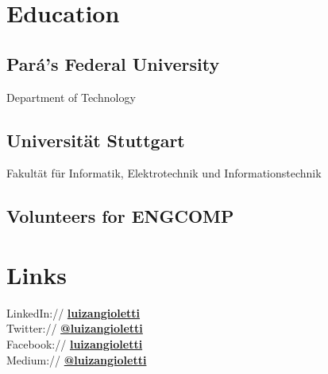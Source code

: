 \documentclass[a4paper]{deedy-resume} %
\begin{document}
\begin{minipage}[t]{0.33\textwidth} %


\section{Education} 

\subsection{Pará's Federal University}

Department of Technology \\

\sectionspace %
\subsection{Universität Stuttgart}
Fakultät für Informatik, Elektrotechnik und Informationstechnik \\
\sectionspace %


\subsection{Volunteers for ENGCOMP}


\sectionspace %


\section{Links} 

LinkedIn:// \href{https://www.linkedin.com/in/luizangioletti/?locale=en_US}{\bf luizangioletti} \\
Twitter:// \href{https://twitter.com/luizangioletti}{\bf @luizangioletti} \\
Facebook:// \href{https://facebook.com/luizangioletti}{\bf luizangioletti} \\
Medium:// \href{https://medium.com/@luizangioletti}{\bf @luizangioletti}\\


\end{minipage}
\end{document}
